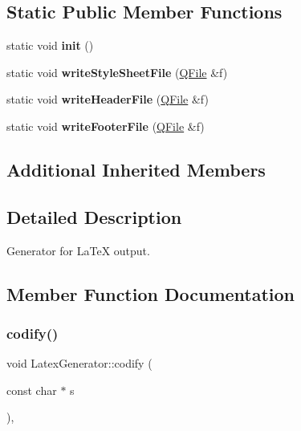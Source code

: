 \subsection*{Static Public Member Functions}
\begin{DoxyCompactItemize}
\item 
\mbox{\label{class_latex_generator_af9a70007c56adecf1af4b4c29591e423}} 
static void {\bfseries init} ()
\item 
\mbox{\label{class_latex_generator_a7dc6aaf4e1ff04591a0bb8a5e7077925}} 
static void {\bfseries write\+Style\+Sheet\+File} (\mbox{\hyperlink{class_q_file}{Q\+File}} \&f)
\item 
\mbox{\label{class_latex_generator_a2b7ee7973bbc2cb6a8220f2193adddfb}} 
static void {\bfseries write\+Header\+File} (\mbox{\hyperlink{class_q_file}{Q\+File}} \&f)
\item 
\mbox{\label{class_latex_generator_a8971729fb24595de8dee491c0ec7bbc2}} 
static void {\bfseries write\+Footer\+File} (\mbox{\hyperlink{class_q_file}{Q\+File}} \&f)
\end{DoxyCompactItemize}
\subsection*{Additional Inherited Members}


\subsection{Detailed Description}
Generator for La\+TeX output. 

\subsection{Member Function Documentation}
\mbox{\label{class_latex_generator_a0013e3c0a103883ba879974c92b5a989}} 
\subsubsection{\texorpdfstring{codify()}{codify()}}
{\footnotesize\ttfamily void Latex\+Generator\+::codify (\begin{DoxyParamCaption}\item[{const char $\ast$}]{s }\end{DoxyParamCaption})\hspace{0.3cm}{\ttfamily [inline]}, {\ttfamily [virtual]}}

